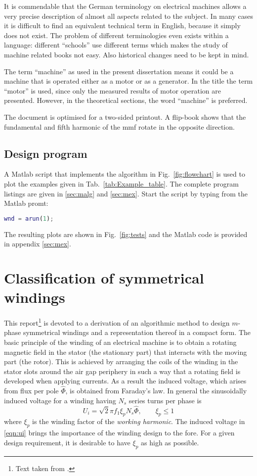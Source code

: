 It is commendable that the German terminology on electrical machines allows a very precise description of almost all aspects related to the subject. In many cases it is difficult to find an equivalent technical term in English, because it simply does not exist. The problem of different terminologies even exists within a language: different ``schools'' use different terms which makes the study of machine related books not easy. Also historical changes need to be kept in mind.

The term ``machine'' as used in the present dissertation means it could be a machine that is operated either as a motor or as a generator. In the title the term ``motor'' is used, since only the measured results of motor operation are presented. However, in the theoretical sections, the word ``machine'' is preferred.  

The document is optimised for a two-sided printout. A flip-book shows that the fundamental and fifth harmonic of the mmf rotate in the opposite direction. 

\section{Design program}
A Matlab script that implements the algorithm in Fig.~\ref{fig:flowchart} is used to plot the examples given in Tab.~\ref{tab:Example_table}. The complete program listings are given in \ref{sec:malg} and \ref{sec:mex}. Start the script by typing from the Matlab promt:

\begin{lstlisting}[language=matlab]
wnd = arun(1);
\end{lstlisting}
The resulting plots are shown in Fig.~\ref{fig:tests} and the Matlab code is provided in appendix \ref{sec:mex}.


\chapter{Classification of symmetrical windings}
This report\footnote{Text taken from \cite{REF-00014}.} is devoted to a derivation of an algorithmic method to design $m$-phase symmetrical windings and a representation thereof in a compact form. The basic principle of the winding of an electrical machine is to obtain a rotating magnetic field in the stator (the stationary part) that interacts with the moving part (the rotor). This is achieved by arranging the coils of the winding in the stator slots around the air gap periphery in such a way that a rotating field is developed when applying currents. As a result the induced voltage, which arises from flux per pole $\hat{\Phi}$, is obtained from Faraday's law. In general the sinusoidally induced voltage for a winding having $N_s$ series turns per phase is
\begin{equation}
  \label{eqn:ui}
  U_i = \sqrt{2} \pi f_1 \xi_p N_s \hat{\Phi}, \qquad \xi_p \leq 1
\end{equation}
where $\xi_p$ is the winding factor of the \textit{working harmonic}. The induced voltage in \eqref{eqn:ui} brings the importance of the winding design to the fore. For a given design requirement, it is desirable to have $\xi_p$ as high as possible.

